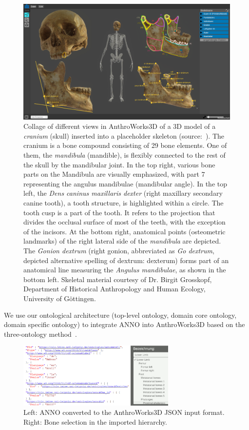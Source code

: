 \documentclass[sw]{iosart2x}
\newcommand{\aw}{AnthroWorks3D}
\newcommand{\latin}[1]{\emph{#1}}
\begin{document}
\begin{figure}[h]
\includegraphics[width=\textwidth]{img/aw3d.png}
\caption{
Collage of different views in \aw{} of a 3D model of a \emph{cranium} (skull) inserted into a placeholder skeleton (source:~\cite{aw3dcidoc}).
The cranium is a bone compound consisting of 29 bone elements.
One of them, the \emph{mandibula} (mandible), is flexibly connected to the rest of the skull by the mandibular joint.
In the top right, various bone parts on the Mandibula are visually emphasized, with part 7 representing the angulus mandibulae (mandibular angle).
In the top left, the \latin{Dens caninus maxillaris dexter} (right maxillary secondary canine tooth), a tooth structure, is highlighted within a circle.
The tooth cusp is a part of the tooth.
It refers to the projection that divides the occlusal surface of most of the teeth, with the exception of the incisors.
At the bottom right, anatomical points (osteometric landmarks) of the right lateral side of the \emph{mandibula} are depicted.
The \latin{Gonion dextrum} (right gonion, abbreviated as \latin{Go dextrum}, depicted alternative spelling of dextrum: dexterum) forms part of an anatomical line measuring the \latin{Angulus mandibulae},
as shown in the bottom left.
Skeletal material courtesy of Dr. Birgit Grosskopf, Department of Historical Anthropology and Human Ecology, University of Göttingen.
}
\label{fig:aw}
\end{figure}

We use our ontological architecture (top-level ontology, domain core ontology, domain specific ontology) to integrate ANNO into \aw{} based on the three-ontology method~\cite{threeontologymethod}.

\begin{figure}[h]
\includegraphics[width=0.7\textwidth]{img/json.png}
\caption{Left: ANNO converted to the \aw{} JSON input format. Right: Bone selection in the imported hierarchy.}
\label{fig:json}
\end{figure}
\end{document}
